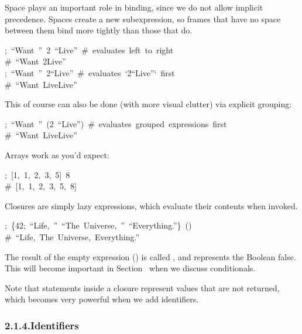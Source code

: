\documentclass[preprint]{{sigplanconf}}
\begin{document}
Space plays an important role in binding, since we do not allow implicit
precedence. Spaces create a new subexpression, so frames that have no
space between them bind more tightly than those that do.%
\begin{mdpre}%
\noindent;~“{Want}~”~2~“{Live}”~{\#~evaluates~left~to~right}\\
{\#~“Want~2Live”}\\
;~“{Want}~”~2“{Live}”~{\#~evaluates~`2“Live”`~first}\\
{\#~“Want~LiveLive”}%
\end{mdpre}\noindent{}This of course can also be done (with more visual clutter) via explicit grouping:
\begin{mdpre}%
\noindent;~“{Want}~”~(2~“{Live}”)~{\#~evaluates~grouped~expressions~first}\\
{\#~“Want~LiveLive”}%
\end{mdpre}\noindent{}Arrays work as you'd expect:
\begin{mdpre}%
\noindent;~{}[1,~1,~2,~3,~5]~8\\
{\#~{}[1,~1,~2,~3,~5,~8]}%
\end{mdpre}\noindent{}Closures are simply lazy expressions, which evaluate their contents when invoked.
\begin{mdpre}%
\noindent;~\{{42};~“{Life},~”~“{The}~{Universe},~”~“{Everything}.”\}~()\\
{\#~“Life,~The~Universe,~Everything.”}%
\end{mdpre}\noindent{}The result of the empty expression (\mdcode{()}) is called , and represents the Boolean false.
This will become important in Section~ when we discuss conditionals.

Note that statements inside a closure represent values that are not
returned, which becomes very powerful when we add identifiers.%

\subsubsection{2.1.4.\hspace*{0.5em}Identifiers}\label{sec-identifiers}%
\end{document}

